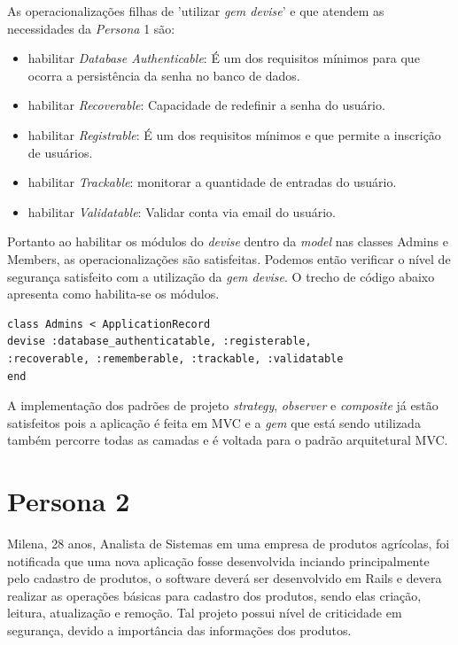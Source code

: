 As operacionalizações filhas de 'utilizar \textit{gem devise}' e que atendem as necessidades da \textit{Persona} 1 são:

\begin{itemize}
	\item habilitar \textit{Database Authenticable}: É um dos requisitos mínimos para que ocorra a persistência da senha no banco de dados.
	\item habilitar \textit{Recoverable}: Capacidade de redefinir a senha do usuário.
	\item habilitar \textit{Registrable}: É um dos requisitos mínimos e que permite a inscrição de usuários. 
	\item habilitar \textit{Trackable}: monitorar a quantidade de entradas do usuário. 
	\item habilitar \textit{Validatable}: Validar conta via email do usuário. 
\end{itemize}

Portanto ao habilitar os módulos do \textit{devise} dentro da \textit{model} nas classes Admins e Members, as operacionalizações são satisfeitas. Podemos então verificar o nível de segurança satisfeito com a utilização da \textit{gem devise}. O trecho de código abaixo apresenta como habilita-se os módulos.  
 

\begin{lstlisting} 
class Admins < ApplicationRecord
devise :database_authenticatable, :registerable,
:recoverable, :rememberable, :trackable, :validatable
end
\end{lstlisting} 

A implementação dos padrões de projeto \textit{strategy}, \textit{observer} e \textit{composite} já estão satisfeitos pois a aplicação é feita em MVC e a \textit{gem} que está sendo utilizada também percorre todas as camadas e é voltada para o padrão arquitetural MVC. 

\section{Persona 2}
\label{subsec:persona2}

Milena, 28 anos, Analista de Sistemas em uma empresa de produtos agrícolas, foi notificada que uma nova aplicação fosse desenvolvida inciando principalmente pelo cadastro de produtos, o software deverá ser desenvolvido em Rails e devera realizar as operações básicas para cadastro dos produtos, sendo elas criação, leitura, atualização e remoção. Tal projeto possui nível de criticidade em segurança, devido a importância das informações dos produtos.


